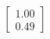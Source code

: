 \documentclass[preview]{standalone}
\begin{document}
\begin{align*}
\begin{bmatrix} 1.00 \\ 0.49 \end{bmatrix}
\end{align*}
\end{document}
